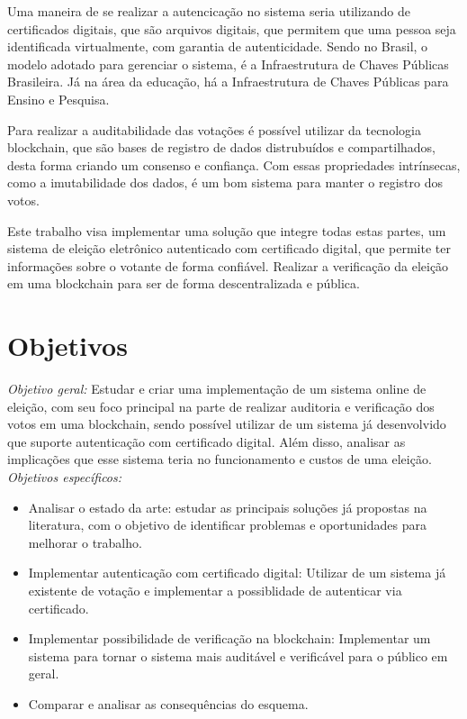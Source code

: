 \documentclass{ufsctex/ufsctex}
\begin{document}
Uma maneira de se realizar a autencicação no sistema seria utilizando de certificados
digitais, que são arquivos digitais, que permitem que uma pessoa seja identificada
virtualmente, com garantia de autenticidade. Sendo no Brasil, o modelo adotado para
gerenciar o sistema, é a Infraestrutura de Chaves Públicas Brasileira. Já na área
da educação, há a Infraestrutura de Chaves Públicas para Ensino e Pesquisa.

Para realizar a auditabilidade das votações é possível utilizar da tecnologia
blockchain, que são bases de registro de dados distrubuídos e compartilhados,
desta forma criando um consenso e confiança. Com essas propriedades intrínsecas,
como a imutabilidade dos dados, é um bom sistema para manter o registro dos votos.

Este trabalho visa implementar uma solução que integre todas estas partes, um sistema
de eleição eletrônico autenticado com certificado digital, que permite ter informações
sobre o votante de forma confiável. Realizar a verificação da eleição em uma blockchain
para ser de forma descentralizada e pública.

\section{Objetivos}

\noindent \emph{Objetivo geral:} Estudar e criar uma implementação de um sistema
online de eleição, com seu foco principal na parte de realizar auditoria e
verificação dos votos em uma blockchain, sendo possível utilizar de um sistema
já desenvolvido que suporte autenticação com certificado digital. Além disso,
analisar as implicações que esse sistema teria no funcionamento e custos de
uma eleição.
\\

\noindent \emph{Objetivos específicos: }
	\begin{itemize}
		\item Analisar o estado da arte: estudar as principais soluções
		já propostas na literatura, com o objetivo de identificar problemas
		e oportunidades para melhorar o trabalho.
		\item Implementar autenticação com certificado digital: Utilizar
		de um sistema já existente de votação e implementar a possiblidade
		de autenticar via certificado.
		\item Implementar possibilidade de verificação na blockchain:
		Implementar um sistema para tornar o sistema mais auditável e 
		verificável para o público em geral.
		\item Comparar e analisar as consequências do esquema.
	\end{itemize}
\\
\end{document}
